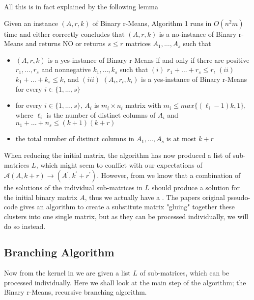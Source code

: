 \documentclass[a4paper]{article}
\begin{document}
All this is in fact explained by the following lemma
\begin{theoremlemma}{\cite[Lemma 5]{fomin_golovach_panolan_2020}}
    Given an instance $(A,r,k)$ of Binary r-Means, Algorithm 1 runs in $O(n^2m)$ time
    and either correctly concludes that $(A,r,k)$ is a no-instance of Binary r-Means and
    returns NO or returns $s \leq r$ matrices $A_1, \dots, A_s$ such that
    \begin{itemize}
        \item $(A,r,k)$ is a yes-instance of Binary r-Means if and only if there are positive
              $r_1,\dots,r_s$ and nonnegative $k_1,\dots,k_s$ such that $(i)$ $r_1 + \dots + r_s \leq r$,
              $(ii)$ $k_1 + \dots + k_s \leq k$, and $(iii)$ $(A_i,r_i,k_i)$ is a yes-instance of Binary
              r-Means for every $i\in\{1,\dots,s\}$
        \item for every $i\in\{1,\dots,s\}$, $A_i$ is $m_i \times n_i$ matrix with
              $m_i \leq max\{(\ell_i - 1)k, 1\}$, where $\ell_i$ is the number of distinct columns
              of $A_i$ and $n_1 + \dots + n_s \leq (k+1)(k+r)$
        \item the total number of distinct columns in $A_1,\dots,A_s$ is at most $k+r$
    \end{itemize}
    \label{lem:5}
\end{theoremlemma}



When reducing the initial matrix, the algorithm has now produced a list of sub-matrices $L$, which might seem to conflict with our expectations
of $\mathcal{A}(A,k+r) \rightarrow (A^\prime,k^\prime+r^\prime)$. However, from  we know that a combination of the solutions of the 
individual sub-matrices in $L$ should produce a solution for the initial binary matrix $A$, thus we actually have a .
The papers original pseudo-code \cite{fomin_golovach_panolan_2020} gives an algorithm to create a substitute matrix "gluing" together these clusters into 
one single matrix, but as they can be processed individually, we will do so instead.

\subsection{Branching Algorithm}
\label{sec:algo:branching}
Now from the kernel in  we are given a list $L$ of sub-matrices, which can be processed individually. Here we
shall look at the main step of the algorithm; the Binary r-Means, recursive branching algorithm.
\end{document}
